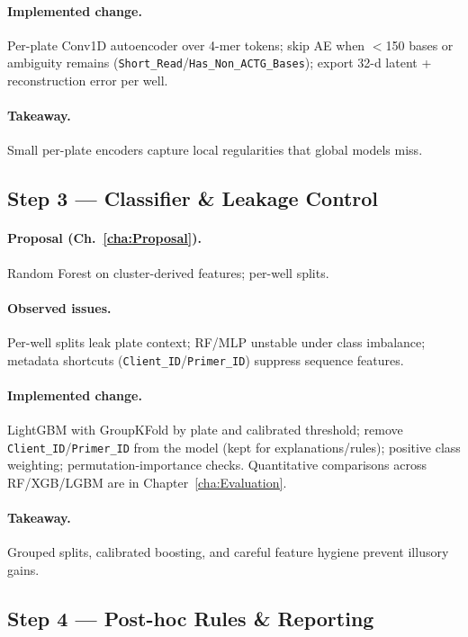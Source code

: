 \paragraph{Implemented change.}
Per-plate Conv1D autoencoder over 4-mer tokens; skip AE when $<$150 bases or ambiguity remains (\texttt{Short\_Read}/\texttt{Has\_Non\_ACTG\_Bases}); export 32-d latent + reconstruction error per well.

\paragraph{Takeaway.} Small per-plate encoders capture local regularities that global models miss.

\subsection*{Step 3 — Classifier \& Leakage Control}
\paragraph{Proposal (Ch.~\ref{cha:Proposal}).}
Random Forest on cluster-derived features; per-well splits.

\paragraph{Observed issues.}
Per-well splits leak plate context; RF/MLP unstable under class imbalance; metadata shortcuts (\texttt{Client\_ID}/\texttt{Primer\_ID}) suppress sequence features.

\paragraph{Implemented change.}
LightGBM with GroupKFold by plate and calibrated threshold; remove \texttt{Client\_ID}/\texttt{Primer\_ID} from the model (kept for explanations/rules); positive class weighting; permutation-importance checks. Quantitative comparisons across RF/XGB/LGBM are in Chapter~\ref{cha:Evaluation}.

\paragraph{Takeaway.} Grouped splits, calibrated boosting, and careful feature hygiene prevent illusory gains.

\subsection*{Step 4 — Post-hoc Rules \& Reporting}
